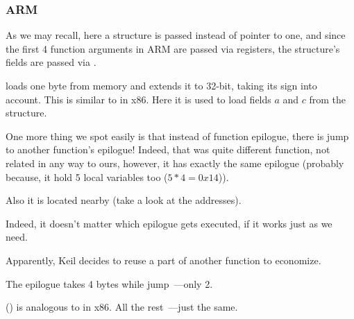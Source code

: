 \subsubsection{ARM}

\myparagraph{\OptimizingKeilVI (\ThumbMode)}



As we may recall, here a structure is passed instead of pointer to one,
and since the first 4 function arguments in ARM are passed via registers,
the structure's fields are passed via .

 loads one byte from memory and extends it to 32-bit, taking its sign into account.
This is similar to \MOVSX in x86.
Here it is used to load fields $a$ and $c$ from the structure.


One more thing we spot easily is that instead of function epilogue, there is jump to another function's epilogue!
Indeed, that was quite different function, not related in any way to ours, however, it has exactly
the same epilogue 
(probably because, it hold 5 local variables too 
($5*4=0x14$)).

Also it is located nearby (take a look at the addresses).

Indeed, it doesn't matter which epilogue gets executed,
if it works just as we need.

Apparently, Keil decides to reuse a part of another function to economize.

The epilogue takes 4 bytes while jump~---only 2.




 () is analogous to \MOVSX in x86.
All the rest~---just the same.


